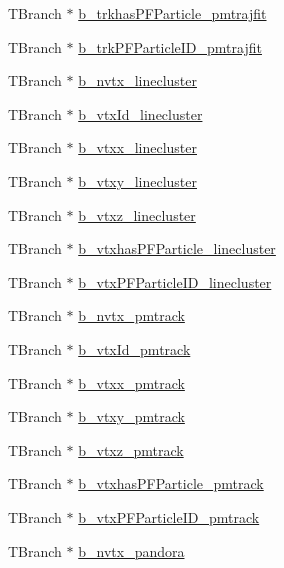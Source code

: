 \begin{DoxyCompactItemize}
\item 
T\-Branch $\ast$ \hyperlink{classanatree_a6677386ec3d5729b7aa090e966fec390}{b\-\_\-trkhas\-P\-F\-Particle\-\_\-pmtrajfit}
\item 
T\-Branch $\ast$ \hyperlink{classanatree_a136a913b9d50584ed3ed9dd179b8c40c}{b\-\_\-trk\-P\-F\-Particle\-I\-D\-\_\-pmtrajfit}
\item 
T\-Branch $\ast$ \hyperlink{classanatree_a2bb40de0d9f4f4d2fc7bd613844f13dc}{b\-\_\-nvtx\-\_\-linecluster}
\item 
T\-Branch $\ast$ \hyperlink{classanatree_a7e4747bf23b621e3ee271b139dde3aef}{b\-\_\-vtx\-Id\-\_\-linecluster}
\item 
T\-Branch $\ast$ \hyperlink{classanatree_a70a10fadb07e0dff76a00e9f02cdb4a4}{b\-\_\-vtxx\-\_\-linecluster}
\item 
T\-Branch $\ast$ \hyperlink{classanatree_ae988c6b98b169d589d76fbba72821617}{b\-\_\-vtxy\-\_\-linecluster}
\item 
T\-Branch $\ast$ \hyperlink{classanatree_a7bb5fd32ae386693303961790df1837a}{b\-\_\-vtxz\-\_\-linecluster}
\item 
T\-Branch $\ast$ \hyperlink{classanatree_ab07e8c7a037d98f785e11583317aab19}{b\-\_\-vtxhas\-P\-F\-Particle\-\_\-linecluster}
\item 
T\-Branch $\ast$ \hyperlink{classanatree_abf79553fcb9213b6c805b3eb8630c449}{b\-\_\-vtx\-P\-F\-Particle\-I\-D\-\_\-linecluster}
\item 
T\-Branch $\ast$ \hyperlink{classanatree_a712ac68eb2df364e326541e83be8982c}{b\-\_\-nvtx\-\_\-pmtrack}
\item 
T\-Branch $\ast$ \hyperlink{classanatree_a902ef4dfb4f5eebeb1617569910f1c5d}{b\-\_\-vtx\-Id\-\_\-pmtrack}
\item 
T\-Branch $\ast$ \hyperlink{classanatree_ab213b75d39115ddbb7200be61e65d06c}{b\-\_\-vtxx\-\_\-pmtrack}
\item 
T\-Branch $\ast$ \hyperlink{classanatree_a7e42cae091e8acea09f7a1e1793fdf57}{b\-\_\-vtxy\-\_\-pmtrack}
\item 
T\-Branch $\ast$ \hyperlink{classanatree_a8cef2626f8c7a254570369450d37b68f}{b\-\_\-vtxz\-\_\-pmtrack}
\item 
T\-Branch $\ast$ \hyperlink{classanatree_a048ce68f96d69eb0a3060d3058f63823}{b\-\_\-vtxhas\-P\-F\-Particle\-\_\-pmtrack}
\item 
T\-Branch $\ast$ \hyperlink{classanatree_a555a82d3c8279ead8b0e1350ec066bab}{b\-\_\-vtx\-P\-F\-Particle\-I\-D\-\_\-pmtrack}
\item 
T\-Branch $\ast$ \hyperlink{classanatree_a954441f012e091e084b0441341e480d1}{b\-\_\-nvtx\-\_\-pandora}

\end{DoxyCompactItemize}
